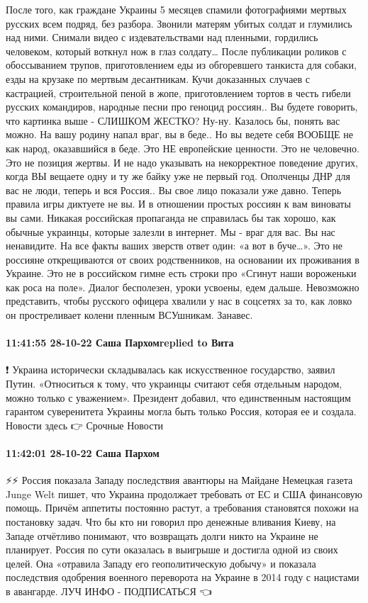 После того, как граждане Украины 5 месяцев спамили фотографиями мертвых русских всем подряд, без разбора. Звонили матерям убитых солдат и глумились над ними. Снимали видео с издевательствами над пленными, гордились человеком, который воткнул нож в глаз солдату… После публикации роликов с обоссыванием трупов, приготовлением еды из обгоревшего танкиста для собаки, езды на крузаке по мертвым десантникам. Кучи доказанных случаев с кастрацией, строительной пеной в жопе, приготовлением тортов в честь гибели русских командиров, народные песни про геноцид россиян.. Вы будете говорить, что картинка выше - СЛИШКОМ ЖЕСТКО? Ну-ну.
Казалось бы, понять вас можно. На вашу родину напал враг, вы в беде.. Но вы ведете себя ВООБЩЕ не как народ, оказавшийся в беде. Это НЕ европейские ценности. Это не человечно. Это не позиция жертвы. И не надо указывать на некорректное поведение других, когда ВЫ вещаете одну и ту же байку уже не первый год. Ополченцы ДНР для вас не люди, теперь и вся Россия..
Вы свое лицо показали уже давно. Теперь правила игры диктуете не вы. И в отношении простых россиян к вам виноваты вы сами. Никакая российская пропаганда не справилась бы так хорошо, как обычные украинцы, которые залезли в интернет. Мы - враг для вас. Вы нас ненавидите. На все факты ваших зверств ответ один: «а вот в буче…».
Это не россияне открещиваются от своих родственников, на основании их проживания в Украине. Это не в российском гимне есть строки про «Сгинут наши вороженьки как роса на поле». Диалог бесполезен, уроки усвоены, едем дальше. Невозможно представить, чтобы русского офицера хвалили у нас в соцсетях за то, как ловко он простреливает колени пленным ВСУшникам. Занавес.

\paragraph{11:41:55 28-10-22 Саша Пархомreplied to Вита}

❗️ Украина исторически складывалась как искусственное государство, заявил Путин.
«Относиться к тому, что украинцы считают себя отдельным народом, можно только с уважением».
Президент добавил, что единственным настоящим гарантом суверенитета Украины могла быть только Россия, которая ее и создала.
Новости здесь 👉 Срочные Новости

\paragraph{11:42:01 28-10-22 Саша Пархом}

⚡️⚡️ Россия показала Западу последствия авантюры на Майдане
Немецкая газета Junge Welt пишет, что Украина продолжает требовать от ЕС и США финансовую помощь. Причём аппетиты постоянно растут, а требования становятся похожи на постановку задач. Что бы кто ни говорил про денежные вливания Киеву, на Западе отчётливо понимают, что возвращать долги никто на Украине не планирует.
Россия по сути оказалась в выигрыше и достигла одной из своих целей. Она «отравила Западу его геополитическую добычу» и показала последствия одобрения военного переворота на Украине в 2014 году с нацистами в авангарде.
ЛУЧ ИНФО - ПОДПИСАТЬСЯ 👈


